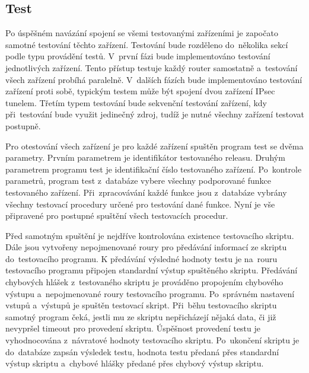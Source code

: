 \subsection{Test}
Po úspěšném navázání spojení se všemi testovanými zařízeními je započato samotné testování těchto zařízení. Testování bude rozděleno do~několika sekcí podle typu provádění testů. V~první fázi bude implementováno testování jednotlivých zařízení. Tento přístup testuje každý router samostatně a~testování všech zařízení probíhá paralelně. V~dalších fázích bude implementováno testování zařízení proti sobě, typickým testem může být spojení dvou zařízení IPsec tunelem. Třetím typem testování bude sekvenční testování zařízení, kdy při~testování bude využit jedinečný zdroj, tudíž je nutné všechny zařízení testovat postupně.

Pro otestování všech zařízení je pro každé zařízení spuštěn program test se dvěma parametry. Prvním parametrem je identifikátor testovaného releasu. Druhým parametrem programu test je identifikační číslo testovaného zařízení. Po~kontrole parametrů, program test z~databáze vybere všechny podporované funkce testovaného zařízení. Při~zpracovávání každé funkce jsou z~databáze vybrány všechny testovací procedury určené pro testování dané funkce. Nyní je vše připravené pro postupné spuštění všech testovacích procedur.

Před samotným spuštění je nejdříve kontrolována existence testovacího skriptu. Dále jsou vytvořeny nepojmenované roury pro předávání informací ze skriptu do~testovacího programu. K předávání výsledné hodnoty testu je na~rouru testovacího programu připojen standardní výstup spuštěného skriptu. Předávání chybových hlášek z~testovaného skriptu je prováděno propojením chybového výstupu a~nepojmenované roury testovacího programu. Po~správném nastavení vstupů a~výstupů je spuštěn testovací skript. Při~běhu testovacího skriptu samotný program čeká, jestli mu ze skriptu nepřicházejí nějaká data, či již nevypršel timeout pro provedení skriptu. Úspěšnost provedení testu je vyhodnocována z~návratové hodnoty testovacího skriptu. Po~ukončení skriptu je do~databáze zapsán výsledek testu, hodnota testu předaná přes standardní výstup skriptu a~chybové hlášky předané přes chybový výstup skriptu.

